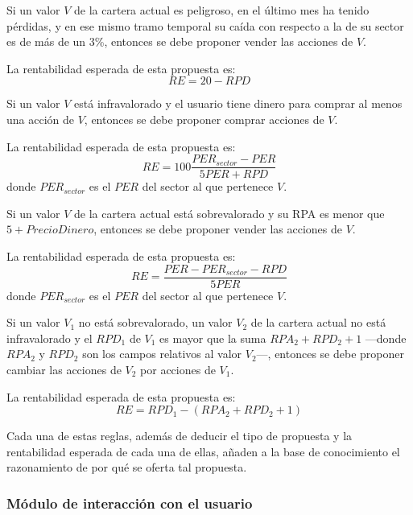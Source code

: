 \documentclass[a4paper, 11pt, titlepage]{article}
\begin{document}
    \begin{regla}
        Si un valor $V$ de la cartera actual es peligroso, en el último mes ha tenido pérdidas, y en ese mismo tramo temporal su caída con respecto a la de su sector es de más de un 3\%, entonces se debe proponer vender las acciones de $V$.

        La rentabilidad esperada de esta propuesta es:
        \[
        RE = 20 - RPD
        \]
    \end{regla}

    \begin{regla}
        Si un valor $V$ está infravalorado y el usuario tiene dinero para comprar al menos una acción de $V$, entonces se debe proponer comprar acciones de $V$.

        La rentabilidad esperada de esta propuesta es:
        \[
        RE = 100 \frac{PER_{sector} - PER}{5 PER + RPD}
        \]
        donde $PER_{sector}$ es el $PER$ del sector al que pertenece $V$.
    \end{regla}

    \begin{regla}
        Si un valor $V$ de la cartera actual está sobrevalorado y su RPA es menor que $5 + PrecioDinero$, entonces se debe proponer vender las acciones de $V$.

        La rentabilidad esperada de esta propuesta es:
        \[
        RE = \frac{PER - PER_{sector} - RPD}{5 PER}
        \]
        donde $PER_{sector}$ es el $PER$ del sector al que pertenece $V$.
    \end{regla}

    \begin{regla}
        Si un valor $V_1$ no está sobrevalorado, un valor $V_2$ de la cartera actual no está infravalorado y el $RPD_1$ de $V_1$ es mayor que la suma $RPA_2 + RPD_2 + 1$ ---donde $RPA_2$ y $RPD_2$ son los campos relativos al valor $V_2$---, entonces se debe proponer cambiar las acciones de $V_2$ por acciones de $V_1$.

        La rentabilidad esperada de esta propuesta es:
        \[
        RE = RPD_1 - (RPA_2 + RPD_2 + 1)
        \]
    \end{regla}

    Cada una de estas reglas, además de deducir el tipo de propuesta y la rentabilidad esperada de cada una de ellas, añaden a la base de conocimiento el razonamiento de por qué se oferta tal propuesta.

    \subsubsection{Módulo de interacción con el usuario}
\end{document}
